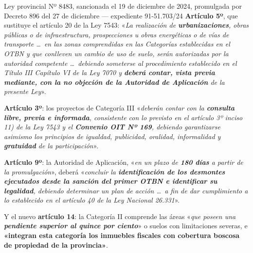 \begin{ficha}{Ley provincial Nº 8483, sancionada el 19 de diciembre de 2024, promulgada por
Decreto 896 del 27 de diciembre --- expediente 91-51.703/24}
\textbf{Artículo 5º}, que sustituye el artículo 20 de la Ley 7543: «\textit{La realización de
\textbf{urbanizaciones}, obras públicas o de infraestructura, prospecciones u obras energéticas
o de vías de transporte \ldots\ en las zonas comprendidas en las Categorías establecidas en el
OTBN y que conlleven un cambio de uso de suelo, serán autorizadas por la autoridad competente
\ldots\ debiendo someterse al procedimiento establecido en el Título III Capítulo VI de la Ley
7070 y \textbf{deberá contar, vista previa mediante, con la no objeción de la Autoridad de
Aplicación} de la presente Ley}».

\textbf{Artículo 3º}: los proyectos de Categoría III «\textit{deberán contar con la
\textbf{consulta libre, previa e informada}, consistente con lo previsto en el artículo 3º
inciso 11) de la Ley 7543 y el \textbf{Convenio OIT Nº 169}, debiendo garantizarse asimismo los
principios de igualdad, publicidad, oralidad, informalidad y \textbf{gratuidad} de la
participación}».

\textbf{Artículo 9º}: la Autoridad de Aplicación, «\textit{en un plazo de \textbf{180 días} a
partir de la promulgación}», deberá «\textit{concluir la \textbf{identificación de los
desmontes ejecutados desde la sanción del primer OTBN e identificar su legalidad}, debiendo
determinar un plan de acción \ldots\ a fin de dar cumplimiento a lo establecido en el artículo
40 de la Ley Nacional 26.331}».

Y el nuevo \textbf{artículo 14}: la Categoría II comprende las áreas «\textit{que poseen una
\textbf{pendiente superior al quince por ciento}}» o suelos con limitaciones severas, e
\textbf{«integran esta categoría los inmuebles fiscales con cobertura boscosa de propiedad de la
provincia»}.
\end{ficha}


